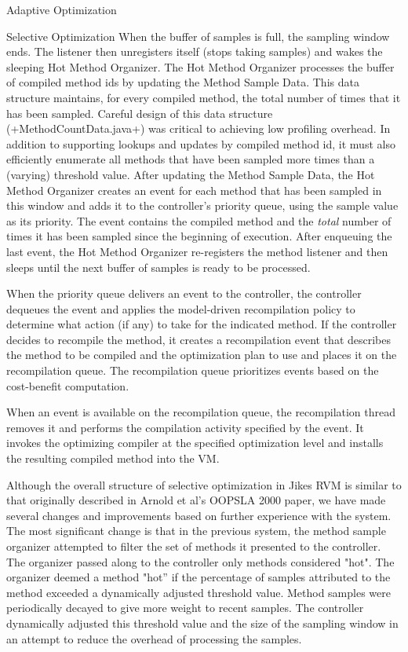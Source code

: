 \begin{chapter}{Adaptive Optimization}
\begin{paragraph}{Selective Optimization}
When the buffer of samples is full, the sampling window ends. The listener then unregisters itself (stops taking samples) and wakes the sleeping Hot Method Organizer.  The Hot Method Organizer processes the buffer of compiled method ids by updating the Method Sample Data.  This data structure maintains, for every compiled method, the total number of times that it has been sampled. Careful design of this data structure (\spverb+MethodCountData.java+) was critical to achieving low profiling overhead. In addition to supporting lookups and updates by compiled method id, it must also efficiently enumerate all methods that have been sampled more times than a (varying) threshold value. After updating the Method Sample Data, the Hot Method Organizer creates an event for each method that has been sampled in this window and adds it to the controller's priority queue, using the sample value as its priority. The event contains the compiled method and the \textit{total} number of times it has been sampled  since the beginning of execution.  After enqueuing the last event, the Hot Method Organizer re-registers the method listener and then sleeps until the next buffer of samples is ready to be processed.

When the priority queue delivers an event to the controller, the controller dequeues the event and applies the model-driven recompilation policy to determine what action (if any) to take for the indicated method.  If the controller decides to recompile the method, it creates a recompilation event that describes the method to be compiled and the optimization plan to use and places it on the recompilation queue. The recompilation queue prioritizes events based on the cost-benefit computation.

When an event is available on the recompilation queue, the recompilation thread removes it and performs the compilation activity specified by the event. It invokes the optimizing compiler at the specified optimization level and installs the resulting compiled method into the VM. 

Although the overall structure of selective optimization in Jikes RVM is similar to that originally described in Arnold et al's OOPSLA 2000 paper, we have made several changes and improvements based on further experience with the system. The most significant change is that in the previous system, the method sample organizer attempted to filter the set of methods it presented to the controller.  The organizer passed along to the controller only methods considered "hot".  The organizer deemed a method "hot'' if the percentage of samples attributed to the method exceeded a dynamically adjusted threshold value. Method samples were periodically decayed to give more weight to recent samples. The controller dynamically adjusted this threshold value and the size of the sampling window in an attempt to reduce the overhead of processing the samples.


\end{paragraph}
\end{chapter}
